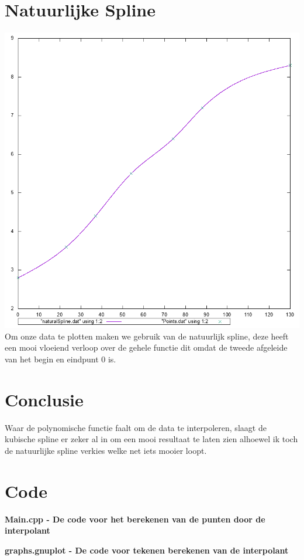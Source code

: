 \documentclass[10pt,a4paper]{article}
\begin{document}
\section{Natuurlijke Spline}
\includegraphics[scale=0.7]{NaturalSpline}
Om onze data te plotten maken we gebruik van de natuurlijk spline, deze heeft een mooi vloeiend verloop over de gehele functie dit omdat de tweede afgeleide van het begin en eindpunt 0 is.

\section{Conclusie}
Waar de polynomische functie faalt om de data te interpoleren, slaagt de kubische spline er zeker al in om een mooi resultaat te laten zien alhoewel ik toch de natuurlijke spline verkies welke net iets mooier loopt.

\section{Code}
\textbf{Main.cpp - De code voor het berekenen van de punten door de interpolant}


\textbf{graphs.gnuplot - De code voor tekenen berekenen van de interpolant}

\end{document}
